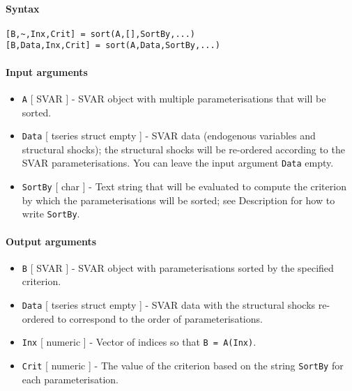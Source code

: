 


	\paragraph{Syntax}\label{syntax}

\begin{verbatim}
[B,~,Inx,Crit] = sort(A,[],SortBy,...)
[B,Data,Inx,Crit] = sort(A,Data,SortBy,...)
\end{verbatim}

\paragraph{Input arguments}\label{input-arguments}

\begin{itemize}
\item
  \texttt{A} {[} SVAR {]} - SVAR object with multiple parameterisations
  that will be sorted.
\item
  \texttt{Data} {[} tseries \textbar{} struct \textbar{} empty {]} -
  SVAR data (endogenous variables and structural shocks); the structural
  shocks will be re-ordered according to the SVAR parameterisations. You
  can leave the input argument \texttt{Data} empty.
\item
  \texttt{SortBy} {[} char {]} - Text string that will be evaluated to
  compute the criterion by which the parameterisations will be sorted;
  see Description for how to write \texttt{SortBy}.
\end{itemize}

\paragraph{Output arguments}\label{output-arguments}

\begin{itemize}
\item
  \texttt{B} {[} SVAR {]} - SVAR object with parameterisations sorted by
  the specified criterion.
\item
  \texttt{Data} {[} tseries \textbar{} struct \textbar{} empty {]} -
  SVAR data with the structural shocks re-ordered to correspond to the
  order of parameterisations.
\item
  \texttt{Inx} {[} numeric {]} - Vector of indices so that
  \texttt{B = A(Inx)}.
\item
  \texttt{Crit} {[} numeric {]} - The value of the criterion based on
  the string \texttt{SortBy} for each parameterisation.
\end{itemize}

